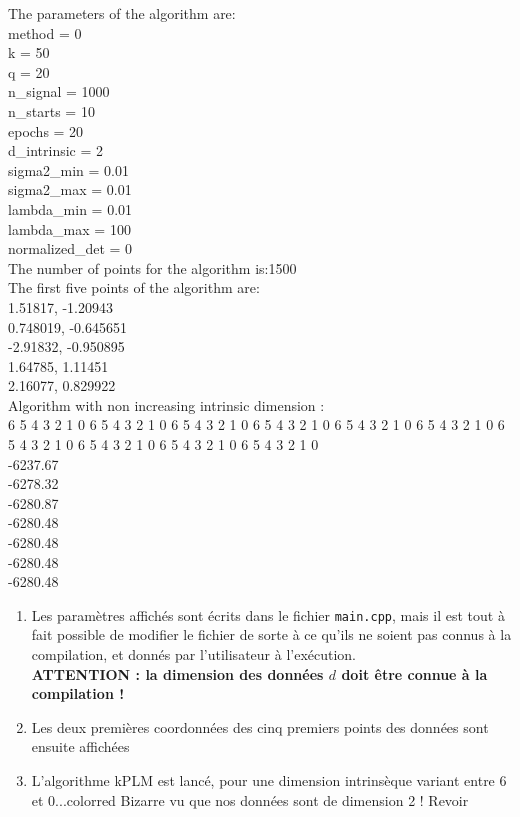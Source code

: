 \documentclass[10pt,a4paper,notitlepage]{article}
\begin{document}
\begin{tcolorbox}
The parameters of the algorithm are:\\
method = 0\\
k = 50\\
q = 20\\
n\_signal = 1000\\
n\_starts = 10\\
epochs = 20\\
d\_intrinsic = 2\\
sigma2\_min = 0.01\\
sigma2\_max = 0.01\\
lambda\_min = 0.01\\
lambda\_max = 100\\
normalized\_det = 0\\
The number of points for the algorithm is:1500\\

The first five points of the algorithm are:\\
1.51817, -1.20943\\
0.748019, -0.645651\\
-2.91832, -0.950895\\
1.64785, 1.11451\\
2.16077, 0.829922\\

Algorithm with non increasing intrinsic dimension : \\
6
5
4
3
2
1
0
6
5
4
3
2
1
0
6
5
4
3
2
1
0
6
5
4
3
2
1
0
6
5
4
3
2
1
0
6
5
4
3
2
1
0
6
5
4
3
2
1
0
6
5
4
3
2
1
0
6
5
4
3
2
1
0
6
5
4
3
2
1
0\\
-6237.67\\
-6278.32\\
-6280.87\\
-6280.48\\
-6280.48\\
-6280.48\\
-6280.48
\end{tcolorbox}

\begin{enumerate}
\item
Les paramètres affichés sont écrits dans le fichier \texttt{main.cpp}, mais il est tout à fait possible de modifier le fichier de sorte à ce qu'ils ne soient pas connus à la compilation, et donnés par l'utilisateur à l'exécution.\\

\textbf{ATTENTION : la dimension des données $d$ doit être connue à la compilation !}
\item
Les deux premières coordonnées des cinq premiers points des données sont ensuite affichées
\item
L'algorithme kPLM est lancé, pour une dimension intrinsèque variant entre 6 et 0...{color{red} Bizarre vu que nos données sont de dimension 2 ! Revoir}
\end{enumerate}
\end{document}
